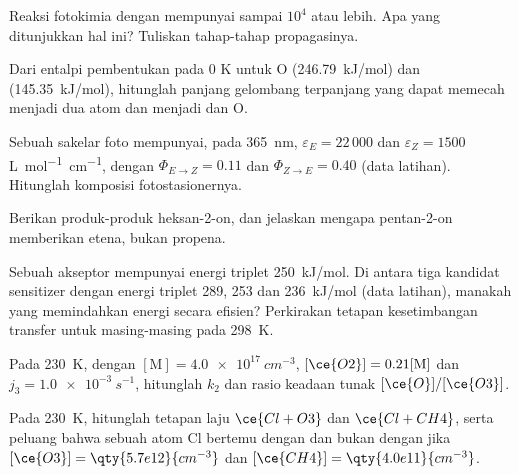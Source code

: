 \begin{exercise}[$\star$]\label{exo:b3:photochemistry:3}
Reaksi fotokimia  dengan  mempunyai  sampai
$10^4$ atau lebih. Apa yang ditunjukkan hal ini? Tuliskan tahap-tahap
propagasinya.
\end{exercise}

\begin{exercise}[$\star$]\label{exo:b3:photochemistry:4}
Dari entalpi pembentukan pada 0 K untuk O (\qty{246.79}{kJ/mol}) dan 
(\qty{145.35}{kJ/mol}), hitunglah panjang gelombang terpanjang yang dapat
memecah  menjadi dua atom dan  menjadi  dan O.
\end{exercise}

\begin{exercise}[$\star\star$]\label{exo:b3:photochemistry:5}
Sebuah sakelar foto mempunyai, pada \qty{365}{nm}, $\varepsilon_E = 22\,000$ dan
$\varepsilon_Z = 1500$ \unit{L.mol^{-1}.cm^{-1}}, dengan $\Phi_{E\to Z} = 0.11$ dan
$\Phi_{Z\to E} = 0.40$ (data latihan). Hitunglah komposisi fotostasionernya.
\end{exercise}

\begin{exercise}[$\star\star$]\label{exo:b3:photochemistry:6}
Berikan produk-produk  heksan-2-on, dan jelaskan mengapa
pentan-2-on memberikan etena, bukan propena.
\end{exercise}

\begin{exercise}[$\star\star$]\label{exo:b3:photochemistry:7}
Sebuah akseptor mempunyai energi triplet \qty{250}{kJ/mol}. Di antara tiga
kandidat sensitizer dengan energi triplet 289, 253 dan \qty{236}{kJ/mol} (data
latihan), manakah yang memindahkan energi secara efisien? Perkirakan tetapan
kesetimbangan transfer untuk masing-masing pada \qty{298}{K}.
\end{exercise}

\begin{exercise}[$\star\star$]\label{exo:b3:photochemistry:8}
Pada \qty{230}{K}, dengan $[\mathrm M] = \qty{4.0e17}{cm^{-3}}$, $[\ce{O2}] = 0.21[\mathrm M]$
dan $j_3 = \qty{1.0e-3}{s^{-1}}$, hitunglah $k_2$ dan rasio keadaan tunak
$[\ce{O}]/[\ce{O3}]$.
\end{exercise}

\begin{exercise}[$\star\star$]\label{exo:b3:photochemistry:9}
Pada \qty{230}{K}, hitunglah tetapan laju $\ce{Cl + O3}$ dan $\ce{Cl + CH4}$, serta
peluang bahwa sebuah atom Cl bertemu dengan  dan bukan dengan 
jika $[\ce{O3}] = \qty{5.7e12}{cm^{-3}}$ dan $[\ce{CH4}] = \qty{4.0e11}{cm^{-3}}$.
\end{exercise}

